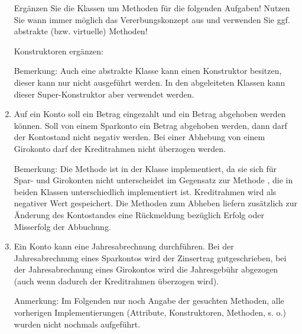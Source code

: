 \documentclass{bschlangaul-aufgabe}
\begin{document}
\begin{enumerate}
Ergänzen Sie die Klassen um Methoden für die folgenden Aufgaben! Nutzen
Sie wann immer möglich das Vererbungskonzept aus und verwenden Sie ggf.
abstrakte (bzw. virtuelle) Methoden!


\begin{bAntwort}
Konstruktoren ergänzen:

Bemerkung: Auch eine abstrakte Klasse kann einen Konstruktor besitzen,
dieser kann nur nicht ausgeführt werden. In den abgeleiteten Klassen
kann dieser Super-Konstruktor aber verwendet werden.
\end{bAntwort}


\item Auf ein Konto soll ein Betrag eingezahlt und ein Betrag abgehoben
werden können. Soll von einem Sparkonto ein Betrag abgehoben werden,
dann darf der Kontostand nicht negativ werden. Bei einer Abhebung von
einem Girokonto darf der Kreditrahmen nicht überzogen werden.

\begin{bAntwort}
Bemerkung: Die Methode  ist in der Klasse 
implementiert, da sie sich für Spar- und Girokonten nicht unterscheidet
im Gegensatz zur Methode , die in beiden Klassen
unterschiedlich implementiert ist.  Kreditrahmen wird als negativer Wert
gespeichert. Die Methoden zum Abheben liefern zusätzlich zur Änderung
des Kontostandes eine Rückmeldung bezüglich Erfolg oder Misserfolg der
Abbuchung.
\end{bAntwort}


\item Ein Konto kann eine Jahresabrechnung durchführen. Bei der
Jahresabrechnung eines Sparkontos wird der Zinsertrag gutgeschrieben,
bei der Jahresabrechnung eines Girokontos wird die Jahresgebühr
abgezogen (auch wenn dadurch der Kreditrahmen überzogen wird).

\begin{bAntwort}
Anmerkung: Im Folgenden nur noch Angabe der gesuchten Methoden, alle
vorherigen Implementierungen (Attribute, Konstruktoren, Methoden, s. o.)
wurden nicht nochmals aufgeführt.
\end{bAntwort}


\end{enumerate}
\end{document}
